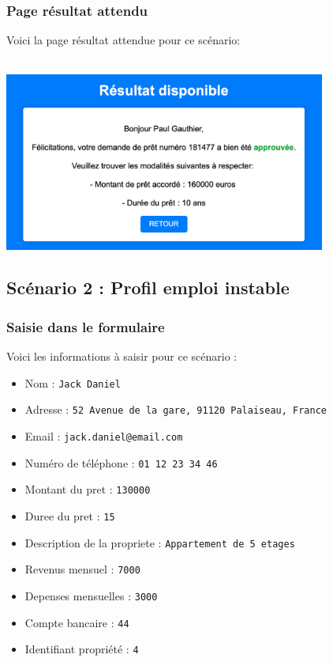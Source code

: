 \documentclass{article}
\begin{document}
        \subsubsection{Page résultat attendu}
        Voici la page résultat attendue pour ce scénario: \\
        \\
        \begin{center}
            \includegraphics[width=300pt]{Images/12.1/resultat1.png}\\
        \end{center}
        
 \newpage
 
    \subsection{Scénario 2 : Profil emploi instable}
        \subsubsection{Saisie dans le formulaire}
        Voici les informations à saisir pour ce scénario :
        \begin{itemize}
            \item Nom : \texttt{Jack Daniel}
            \item Adresse : \texttt{52 Avenue de la gare, 91120 Palaiseau, France}  
            \item Email : \texttt{jack.daniel@email.com}  
            \item Numéro de téléphone : \texttt{01 12 23 34 46}  
            \item Montant du pret : \texttt{130000}  
            \item Duree du pret : \texttt{15}  
            \item Description de la propriete : \texttt{Appartement de 5 etages}  
            \item Revenus mensuel : \texttt{7000}
            \item Depenses mensuelles : \texttt{3000}
            \item Compte bancaire : \texttt{44}
            \item Identifiant propriété : \texttt{4}
        \end{itemize}
        
\end{document}
